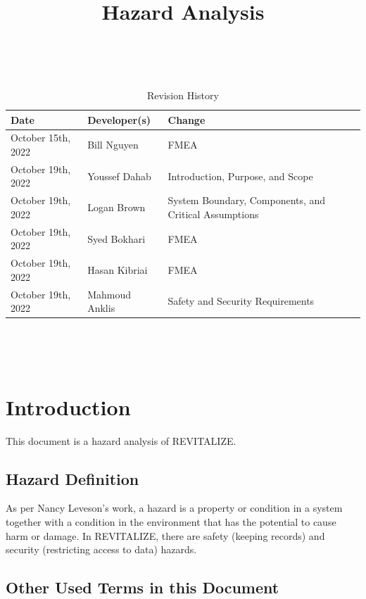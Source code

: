 \documentclass{article}
\title{Hazard Analysis\\\progname}
\author{\authname}
\date{}
\begin{document}
\maketitle
\thispagestyle{empty}

~\newpage


\begin{table}[hp]
	\caption{Revision History} \label{TblRevisionHistory}
	\begin{tabularx}{\textwidth}{llX}
		\toprule
		\textbf{Date} & \textbf{Developer(s)} & \textbf{Change}\\
		\midrule
		October 15th, 2022 & Bill Nguyen & FMEA \\
		October 19th, 2022 & Youssef Dahab & Introduction, Purpose, and Scope \\
        		October 19th, 2022 & Logan Brown & System Boundary, Components, and Critical Assumptions\\
		October 19th, 2022 & Syed Bokhari & FMEA\\
		October 19th, 2022 & Hasan Kibriai & FMEA\\
		October 19th, 2022 & Mahmoud Anklis & Safety and Security Requirements\\
		\bottomrule
	\end{tabularx}
\end{table}

~\newpage

\tableofcontents

~\newpage


\section{Introduction}
This document is a hazard analysis of REVITALIZE.

\subsection{Hazard Definition}
As per Nancy Leveson's work, a hazard is a property or condition in a system together with a condition in the environment that has the potential to cause harm or damage. In REVITALIZE, there are safety (keeping records) and security (restricting access to data) hazards.

\subsection{Other Used Terms in this Document}
\end{document}
